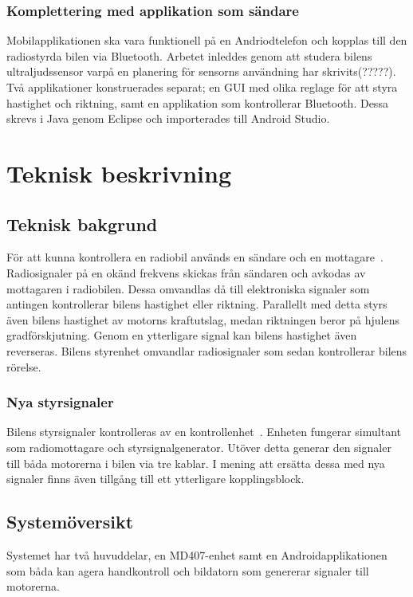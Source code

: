 \documentclass[a4paper]{article}
\begin{document}
\subsubsection{Komplettering med applikation som sändare}
\vspace{5mm} \noindent
Mobilapplikationen ska vara funktionell på en Andriodtelefon och kopplas till den radiostyrda bilen via Bluetooth. Arbetet inleddes genom att studera bilens ultraljudssensor varpå en planering för sensorns användning har skrivits(?????). Två applikationer konstruerades separat; en GUI med olika reglage för att styra hastighet och riktning, samt en applikation som kontrollerar Bluetooth. Dessa skrevs i Java genom Eclipse och importerades till Android Studio.

\newpage
\section{Teknisk beskrivning}

\subsection{Teknisk bakgrund}
För att kunna kontrollera en radiobil används en sändare och en mottagare~\cite{RCTechnique}. Radiosignaler på en okänd frekvens skickas från sändaren och avkodas av mottagaren i radiobilen. Dessa omvandlas då till elektroniska signaler som antingen kontrollerar bilens hastighet eller riktning. Parallellt med detta styrs även bilens hastighet av motorns kraftutslag, medan riktningen beror på hjulens gradförskjutning. Genom en ytterligare signal kan bilens hastighet även reverseras. Bilens styrenhet omvandlar radiosignaler som sedan kontrollerar bilens rörelse.

\subsubsection{Nya styrsignaler}
Bilens styrsignaler kontrolleras av en kontrollenhet~\cite{projektDir}. Enheten fungerar simultant som radiomottagare och styrsignalgenerator. Utöver detta generar den signaler till båda motorerna i bilen via tre kablar. I mening att ersätta dessa med nya signaler finns även tillgång till ett ytterligare kopplingsblock.


\subsection{Systemöversikt}
Systemet har två huvuddelar, en MD407-enhet samt en Androidapplikationen som båda  kan agera handkontroll och bildatorn som genererar signaler till motorerna.
\end{document}
